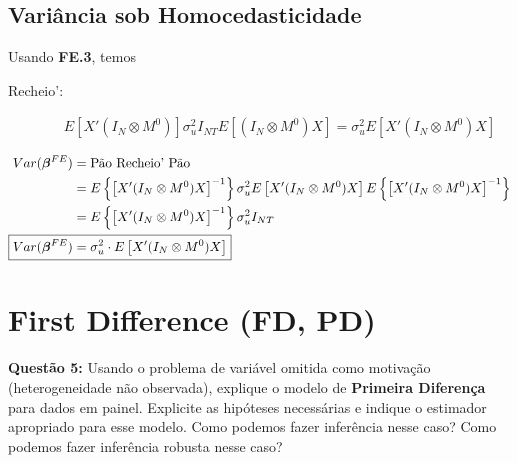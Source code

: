 \documentclass[11pt,oneside,a4paper]{article}
\numberwithin{equation}{section}
\begin{document}
\begin{description}
\subsection*{Variância sob Homocedasticidade}

Usando \textbf{FE.3}, temos

\begin{description}
\item [Recheio':]
\begin{align*}
E \left[ X' ( I_{N} \otimes M^{0} ) \right]
\sigma^2_{u} I_{NT}
E \left[ ( I_{N} \otimes M^{0} ) X \right]
=
\sigma^2_{u}
E \left[ X' ( I_{N} \otimes M^{0} ) X \right]
\end{align*}
\end{description}

\noindent
{}

\vspace{-2 em}
\begin{align*}
Var( \mbs{\beta}^{FE} ) &= \text{Pão Recheio' Pão} 
\\ &=
E \left\{ \left[
X' ( I_{N} \otimes M^{0} ) X
\right]^{-1} \right\}
\sigma_{u}^{2} E\left[ X' ( I_{N} \otimes M^{0} ) X \right]
E \left\{ \left[
X' ( I_{N} \otimes M^{0} ) X
\right]^{-1} \right\}
\\  &=
E \left\{ \left[
X' ( I_{N} \otimes M^{0} ) X
\right]^{-1} \right\}
\sigma_{u}^{2} I_{NT}
\\
\Aboxed{ Var( \mbs{\beta}^{FE} ) &= \sigma_{u}^{2} \cdot  E\left[ X' ( I_{N} \otimes M^{0} ) X \right] }
\end{align*}


\clearpage
\section{First Difference (FD, PD)}

\noindent
\textbf{Questão 5:}
Usando o problema de variável omitida como motivação (heterogeneidade não observada), explique o modelo de \textbf{Primeira Diferença} para dados em painel.
Explicite as hipóteses necessárias e indique o estimador apropriado para esse modelo.
Como podemos fazer inferência nesse caso?
Como podemos fazer inferência robusta nesse caso?


\end{description}
\end{document}
